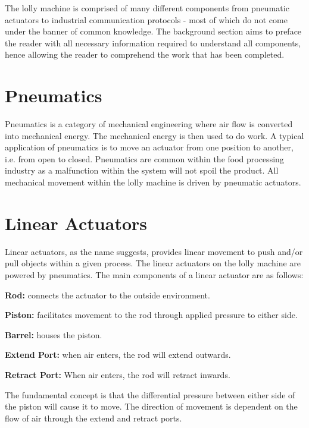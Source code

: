 

The lolly machine is comprised of many different components from pneumatic actuators to industrial communication protocols - most of which do not come under the banner of common knowledge. The background section aims to preface the reader with all necessary information required to understand all components, hence allowing the reader to comprehend the work that has been completed. 

\section{Pneumatics}
    Pneumatics is a category of mechanical engineering  where air flow is converted into mechanical energy\cite{parr2011hydraulics}. The mechanical energy is then used to do work. A typical application of pneumatics is to move an actuator from one position to another, i.e. from open to closed. Pneumatics are common within the food processing industry as a malfunction within the system will not spoil the product.
    All mechanical movement within the lolly machine is driven by pneumatic actuators.
    
\section{Linear Actuators}
    Linear actuators, as the name suggests, provides linear movement to push and/or pull objects within a given process. The linear actuators on the lolly machine are powered by pneumatics. The main components of a linear actuator are as follows:
    
    \begin{description} 
        \item\textbf{Rod:} connects the actuator to the outside environment.
        \item\textbf{Piston:} facilitates movement to the rod through applied pressure to either side.
        \item\textbf{Barrel:} houses the piston.
        \item\textbf{Extend Port:} when air enters, the rod will extend outwards.
        \item\textbf{Retract Port:} When air enters, the rod will retract inwards.
    \end{description}
    
    The fundamental concept is that the differential pressure between either side of the piston will cause it to move\cite{parr2011hydraulics}. The direction of movement is dependent on the flow of air through the extend and retract ports.
    
